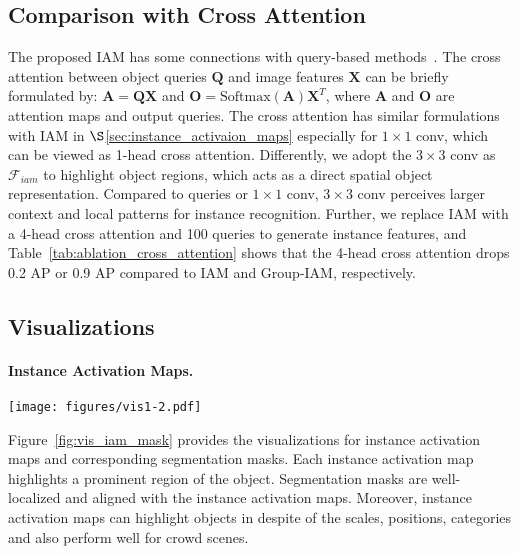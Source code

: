 \documentclass[10pt,twocolumn,letterpaper]{article}
\begin{document}
\subsection{Comparison with Cross Attention}
The proposed IAM has some connections with query-based methods~\cite{DETRCarionMSUKZ20,WangZAYC21MaxDeepLab,mask_former_abs-2107-06278,KNetabs-2106-14855}.
The cross attention between object queries $\mathbf{Q}$ and image features $\mathbf{X}$ can be briefly formulated by: $\mathbf{A}\!=\! \mathbf{Q}\mathbf{X}$ and $\mathbf{O}\!= \!\text{Softmax}(\mathbf{A})\mathbf{X}^T$, where $\mathbf{A}$ and $\mathbf{O}$ are attention maps and output queries. The cross attention has similar formulations with IAM in $\S$\ref{sec:instance_activaion_maps} especially for $1\!\times\!1$ conv, which can be viewed as 1-head cross attention.
Differently, we adopt the $3\!\times\!3$ conv as $\mathcal{F}_{iam}$ to highlight object regions, which acts as a direct spatial object representation.
Compared to queries or $1\!\times\!1$ conv, $3\!\times\!3$ conv perceives larger context and local patterns for instance recognition.
Further, we replace IAM with a 4-head cross attention and 100 queries to generate instance features, and Table~\ref{tab:ablation_cross_attention} shows that the 4-head cross attention drops 0.2 AP or 0.9 AP compared to IAM and Group-IAM, respectively.

\subsection{Visualizations}
\paragraph{Instance Activation Maps.}
\begin{figure*}[h]
    \centering
    \texttt{[image: figures/vis1-2.pdf]}
    \vspace{-5pt}
    \caption{\textbf{Visualizations for Instance Activation Maps.} We present the visualizations of the instance activation maps and segmentation masks. For each input image, the upper row shows the instance activation maps and the bottom row shows the corresponding segmentation masks. The instance activation maps tend to highlight the discriminative regions of the objects regardless of the scales, occlusion, and poses.
    Best viewed on screen after zooming in.}
    \label{fig:vis_iam_mask}
    \vspace{-5pt}
\end{figure*}
Figure~\ref{fig:vis_iam_mask} provides the visualizations for instance activation maps and corresponding segmentation masks. Each instance activation map highlights a prominent region of the object.
Segmentation masks are well-localized and aligned with the instance activation maps.
Moreover, instance activation maps can highlight objects in despite of the scales, positions, categories and also perform well for crowd scenes.
\end{document}
